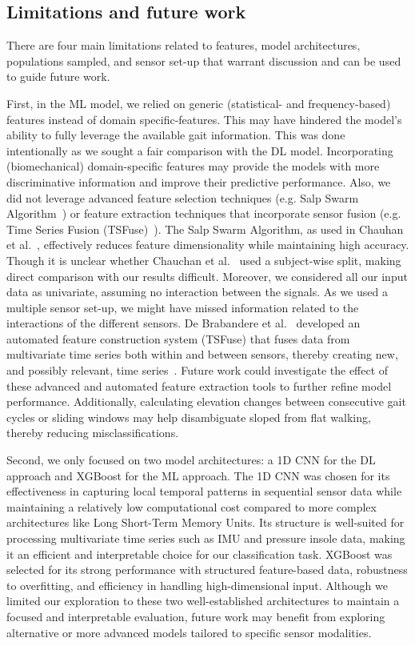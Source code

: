 \documentclass[sensors,article,submit,pdftex,moreauthors]{Definitions/mdpi}
\begin{document}
\subsection{Limitations and future work}
There are four main limitations related to features, model architectures, populations sampled, and sensor set-up that warrant discussion and can be used to guide future work. 

First, in the ML model, we relied on generic (statistical- and frequency-based) features instead of domain specific-features. This may have hindered the model's ability to fully leverage the available gait information. This was done intentionally as we sought a fair comparison with the DL model. Incorporating (biomechanical) domain-specific features may provide the models with more discriminative information and improve their predictive performance. Also, we did not leverage advanced feature selection techniques (e.g. Salp Swarm Algorithm~\cite{mirjalili2017salp}) or feature extraction techniques that incorporate sensor fusion (e.g. Time Series Fusion (TSFuse)~\cite{de2024tsfuse}). The Salp Swarm Algorithm, as used in Chauhan et al.~\cite{chauhan2025classifying}, effectively reduces feature dimensionality while maintaining high accuracy. Though it is unclear whether Chauchan et al.~\cite{chauhan2025classifying} used a subject-wise split, making direct comparison with our results difficult. Moreover, we considered all our input data as univariate,  assuming no interaction between the signals. As we used a multiple sensor set-up, we might have missed information related to  the interactions of the different sensors. De Brabandere et al.~\cite{de2024tsfuse} developed an automated feature construction system (TSFuse) that fuses data from multivariate time series both within and between sensors, thereby creating new, and possibly relevant, time series~\cite{de2024tsfuse}. Future work could investigate the effect of these advanced and automated feature extraction tools to further refine model performance.
\textcolor{revision}{Additionally, calculating elevation changes between consecutive gait cycles or sliding windows may help disambiguate sloped from flat walking, thereby reducing misclassifications.}

Second, we only focused on two model architectures: a 1D CNN for the DL approach and XGBoost for the ML approach. The 1D CNN was chosen for its effectiveness in capturing local temporal patterns in sequential sensor data while maintaining a relatively low computational cost compared to more complex architectures like Long Short-Term Memory Units. Its structure is well-suited for processing multivariate time series such as IMU and pressure insole data, making it an efficient and interpretable choice for our classification task. XGBoost was selected for its strong performance with structured feature-based data, robustness to overfitting, and efficiency in handling high-dimensional input. Although we limited our exploration to these two well-established architectures to maintain a focused and interpretable evaluation, future work may benefit from exploring alternative or more advanced models tailored to specific sensor modalities.
\end{document}
